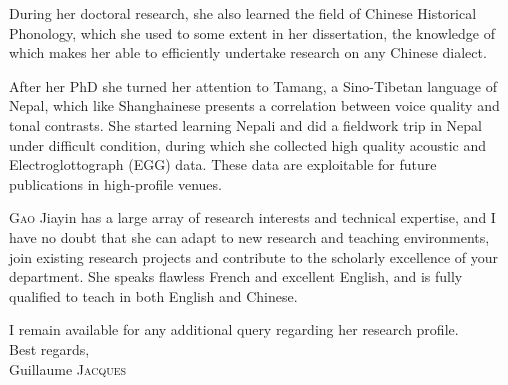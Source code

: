 \documentclass[oldfontcommands,oneside,a4paper,11pt]{article}
\begin{document}
During her doctoral research, she also learned the field of Chinese Historical Phonology, which she used to some extent in her dissertation, the knowledge of which makes her able to efficiently undertake research on any Chinese dialect.

After her PhD she turned her attention to Tamang, a Sino-Tibetan language of Nepal, which like Shanghainese presents a correlation between voice quality and tonal contrasts. She started learning Nepali and did a fieldwork trip in Nepal under difficult condition, during which she collected high quality acoustic and Electroglottograph (EGG) data. These data are exploitable for future publications in high-profile venues.

\textsc{Gao} Jiayin has a large array of research interests and technical expertise,  and I have no doubt that she can adapt to new research and teaching environments, join existing research projects and contribute to the scholarly excellence of your department. She speaks flawless French and excellent English, and is fully qualified to teach in both  English and Chinese.

I remain available for any additional query regarding her research profile.\\

Best regards,\\

Guillaume \textsc{Jacques}
\end{document}
